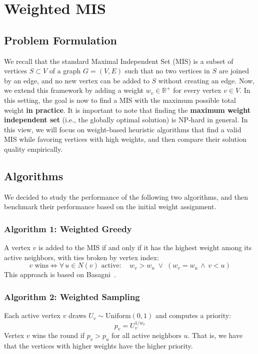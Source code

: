 \documentclass{article}
\begin{document}
\section{Weighted MIS}

\subsection{Problem Formulation}

We recall that the standard Maximal Independent Set (MIS) is a subset of vertices $S\subset V$ of a graph $G=(V, E)$ such that no two vertices in $S$ are joined by an edge, and no new vertex can be added to $S$ without creating an edge. Now, we extend this framework by adding a weight $w_v\in \mathbb{R}^+$ for every vertex $v\in V$. In this setting, the goal is now to find a MIS with the maximum possible total weight \textbf{in practice}. It is important to note that finding the \textbf{maximum weight independent set} (i.e., the globally optimal solution) is NP-hard in general. In this view, we will focus on weight-based heuristic algorithms that find a valid MIS while favoring vertices with high weights, and then compare their solution quality empirically. 

\subsection{Algorithms}

We decided to study the performance of the following two algorithms, and then benchmark their performance based on the initial weight assignment. 

\subsubsection{Algorithm 1: Weighted Greedy}
A vertex $v$ is added to the MIS if and only if it has the highest weight among its active neighbors, with ties broken by vertex index:
\begin{equation}
  v \text{ wins} \iff \forall\, u \in N(v) \text{ active}:\quad w_v > w_u \;\lor\; (w_v = w_u \,\land\, v < u)
\end{equation}
This approach is based on Basagni~\cite{basagni2001}.
\subsubsection{Algorithm 2: Weighted Sampling}
Each active vertex $v$ draws $U_v \sim \text{Uniform}(0,1)$ and computes a priority:
\begin{equation}
  p_v = U_v^{1/w_v}
\end{equation}
Vertex $v$ wins the round if $p_v > p_u$ for all active neighbors $u$. That is, we have that the vertices with higher weights have the higher priority. 
\end{document}
